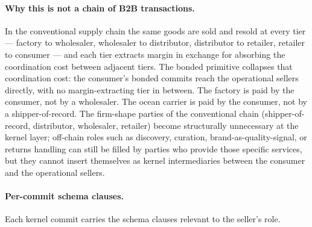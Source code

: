 \documentclass[11pt,a4paper]{article}
\theoremstyle{definition}
\theoremstyle{remark}
\begin{document}
\paragraph{Why this is not a chain of B2B transactions.}
In the conventional supply chain the same goods are sold and
resold at every tier --- factory to wholesaler, wholesaler to
distributor, distributor to retailer, retailer to consumer ---
and each tier extracts margin in exchange for absorbing the
coordination cost between adjacent tiers. The bonded primitive
collapses that coordination cost: the consumer's bonded commits
reach the operational sellers directly, with no margin-extracting
tier in between. The factory is paid by the consumer, not by a
wholesaler. The ocean carrier is paid by the consumer, not by a
shipper-of-record. The firm-shape parties of the conventional
chain (shipper-of-record, distributor, wholesaler, retailer)
become structurally unnecessary at the kernel layer; off-chain
roles such as discovery, curation, brand-as-quality-signal, or
returns handling can still be filled by parties who provide those
specific services, but they cannot insert themselves as kernel
intermediaries between the consumer and the operational sellers.

\paragraph{Per-commit schema clauses.}
Each kernel commit carries the schema clauses relevant to the
seller's role.
\end{document}
